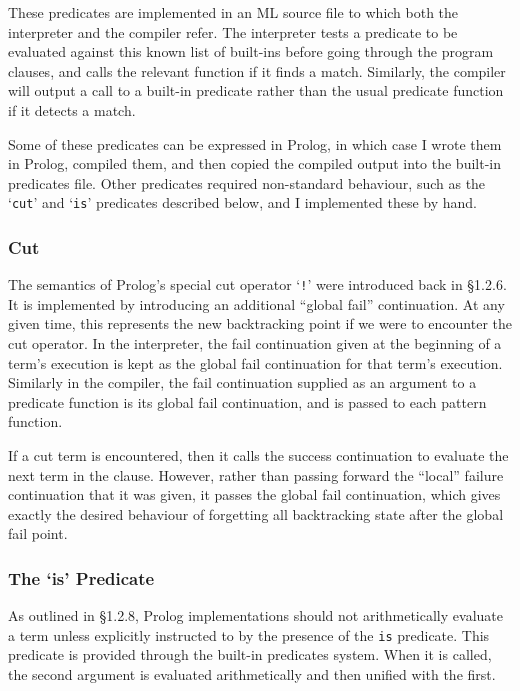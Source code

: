 \documentclass[12pt]{article}
\begin{document}
These predicates are implemented in an ML source file to which both the interpreter and the compiler refer.
The interpreter tests a predicate to be evaluated against this known list of built-ins before going through the program clauses, and calls the relevant function if it finds a match. 
Similarly, the compiler will output a call to a built-in predicate rather than the usual predicate function if it detects a match.

Some of these predicates can be expressed in Prolog, in which case I wrote them in Prolog, compiled them, and then copied the compiled output into the built-in predicates file. 
Other predicates required non-standard behaviour, such as the `\verb|cut|' and `\verb|is|' predicates described below, and I implemented these by hand.

\subsubsection{Cut}

The semantics of Prolog's special cut operator `\verb|!|' were introduced back in \S1.2.6.
It is implemented by introducing an additional ``global fail'' continuation. 
At any given time, this represents the new backtracking point if we were to encounter the cut operator. 
In the interpreter, the fail continuation given at the beginning of a term's execution is kept as the global fail continuation for that term's execution. 
Similarly in the compiler, the fail continuation supplied as an argument to a predicate function is its global fail continuation, and is passed to each pattern function.

If a cut term is encountered, then it calls the success continuation to evaluate the next term in the clause.
However, rather than passing forward the ``local'' failure continuation that it was given, it passes the global fail continuation, which gives exactly the desired behaviour of forgetting all backtracking state after the global fail point.

\subsubsection{The `is' Predicate}

As outlined in \S1.2.8, Prolog implementations should not arithmetically evaluate a term unless explicitly instructed to by the presence of the \verb|is| predicate.
This predicate is provided through the built-in predicates system.
When it is called, the second argument is evaluated arithmetically and then unified with the first.
\end{document}
